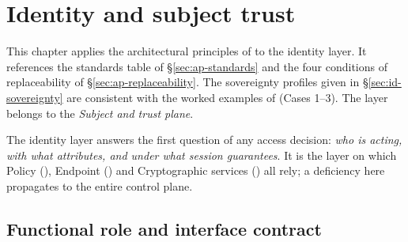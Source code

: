 
\chapter{Identity and subject trust}
\label{ch:identity}

\begin{caveatbox}[Dependencies]
\noindent This chapter applies the architectural principles of
 to the identity layer. It
references the standards table of \S\ref{sec:ap-standards} and the four conditions of
replaceability of \S\ref{sec:ap-replaceability}. The sovereignty profiles given in
\S\ref{sec:id-sovereignty} are consistent with the worked examples of
 (Cases 1--3). The layer belongs to the
\emph{Subject and trust plane}.
\end{caveatbox}

The identity layer answers the first question of any access decision:
\emph{who is acting, with what attributes, and under what session
guarantees}. It is the layer on which Policy
(), Endpoint () and
Cryptographic services () all rely; a deficiency
here propagates to the entire control plane.

\section{Functional role and interface contract}
\label{sec:id-contract}

